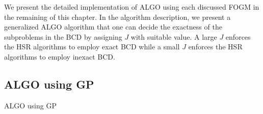 We present the detailed implementation of ALGO using each discussed FOGM in
the remaining of this chapter.
In the algorithm description, we present a generalized ALGO algorithm that one
can decide the exactness of the subproblems in the BCD by assigning $J$ with
suitable value.
A large $J$ enforces the HSR algorithms to employ exact BCD while a small $J$
enforces the HSR algorithms to employ inexact BCD.

\subsection{ALGO using GP}
\begin{algorithm}[H]
    \caption{ALGO using GP}
    \label{alg:GEN_FRAMEWORK_OF_HSR_BY_GP}
    \begin{algorithmic}[1]
            \EndFor

\end{algorithmic}
\end{algorithm}

